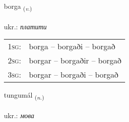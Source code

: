 \documentclass[frontgrid, backgrid]{flacards}\usepackage[]{graphicx}\usepackage[]{xcolor}
\begin{document}
\renewcommand{\flhead}{\vskip5pt \fboxsep=0pt {\small\bfseries\footnotesize Sagnorð | дієслово}}
\renewcommand{\fcfoot}{\vskip5pt \fboxsep=0pt \hspace{2pt}{\small\bfseries\footnotesize 1K}}

\renewcommand{\blhead}{\vskip5pt {\small\bfseries\footnotesize Sagnorð | дієслово }}
\renewcommand{\bcfoot}{\vskip5pt \hspace{2pt}{\small\bfseries\footnotesize 1K}}


{borga \small{\textsubscript{(\textit{v.})}} \\[1ex] %
\textphonetic{[pɔrka]} \\
ukr.: \emph{платити} \\  [2ex]
\renewcommand*{\arraystretch}{0.8}
\begin{tabular}{p{1cm}l}
\textsc{1sg}: & borga -- borgaði -- borgað \\ 
\textsc{2sg}: & borgar -- borgaðir -- borgað \\ 
\textsc{3sg}: & borgar -- borgaði -- borgað \\ 
\end{tabular}
}

\renewcommand{\flhead}{\vskip5pt \fboxsep=0pt {\small\bfseries\footnotesize Nafnorð | іменник}}
\renewcommand{\fcfoot}{\vskip5pt \fboxsep=0pt \hspace{2pt}{\small\bfseries\footnotesize 1K}}

\renewcommand{\blhead}{\vskip5pt {\small\bfseries\footnotesize Nafnorð | іменник }}
\renewcommand{\bcfoot}{\vskip5pt \hspace{2pt}{\small\bfseries\footnotesize 1K}}


{tungumál \small{\textsubscript{(\textit{n.})}} \\[1ex] %
\textphonetic{[tʰuŋkʏmaul]} \\
ukr.: \emph{мова} \\  [2ex]
\renewcommand*{\arraystretch}{0.8}
}
\end{document}
